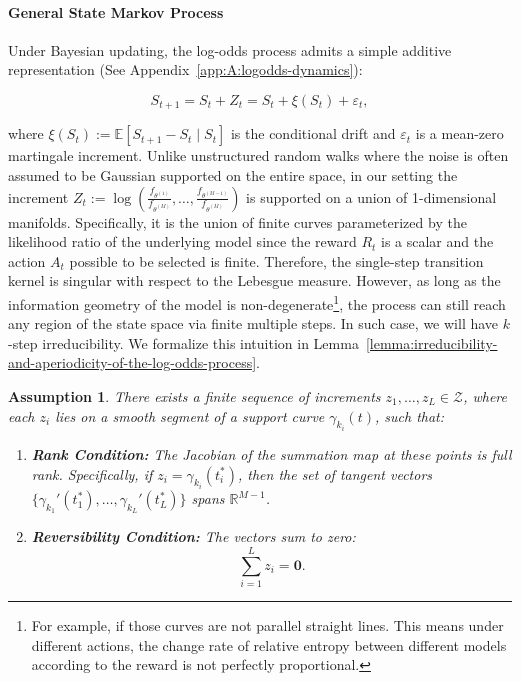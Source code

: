 \documentclass[12pt]{article}
\newtheorem{assumption}{Assumption}
\begin{document}
\paragraph{General State Markov Process} Under Bayesian updating, the log-odds process admits a simple additive representation (See Appendix~\ref{app:A:logodds-dynamics}):

\begin{equation}S_{t+1} = S_t + Z_t = S_t + \xi(S_t) + \varepsilon_t,\label{eq:logodds-main}
\end{equation}

where $\xi(S_t) := \mathbb{E}[S_{t+1} - S_t \mid S_t]$ is the conditional drift and $\varepsilon_t$ is a mean-zero martingale increment. Unlike unstructured random walks where the noise is often assumed to be Gaussian supported on the entire space, in our setting the increment $Z_t := \log \left( \frac{f_{\theta^{(1)}}}{f_{\theta^{(M)}}}, \ldots, \frac{f_{\theta^{(M-1)}}}{f_{\theta^{(M)}}} \right)$ is supported on a union of 1-dimensional manifolds. Specifically, it is the union of finite curves parameterized by the likelihood ratio of the underlying model since the reward $R_t$ is a scalar and the action $A_t$ possible to be selected is finite. Therefore, the single-step transition kernel is singular with respect to the Lebesgue measure. However, as long as the information geometry of the model is non-degenerate\footnote{For example, if those curves are not parallel straight lines. This means under different actions, the change rate of relative entropy between different models according to the reward is not perfectly proportional.}, the process can still reach any region of the state space via finite multiple steps. In such case, we will have $k$-step irreducibility. We formalize this intuition in Lemma~\ref{lemma:irreducibility-and-aperiodicity-of-the-log-odds-process}. 

\begin{assumption}\label{assum:full-rank-Reversibility}
    There exists a finite sequence of increments $z_1, \dots, z_L \in \mathcal{Z}$, where each $z_i$ lies on a smooth segment of a support curve $\gamma_{k_i}(t)$, such that:
    \begin{enumerate}
        \item \textbf{Rank Condition:} The Jacobian of the summation map at these points is full rank. Specifically, if $z_i = \gamma_{k_i}(t_i^*)$, then the set of tangent vectors $\{\gamma_{k_1}'(t_1^*), \dots, \gamma_{k_L}'(t_L^*)\}$ spans $\mathbb{R}^{M-1}$.
        \item \textbf{Reversibility Condition:} The vectors sum to zero:\[ \sum_{i=1}^L z_i = \mathbf{0}. \]
    \end{enumerate}
\end{assumption}
\end{document}
